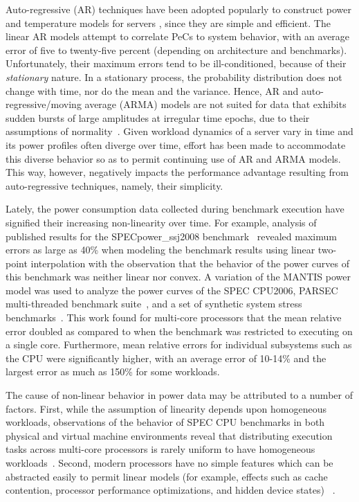 \documentclass[prodmode,acmtaco,pdftex]{acmsmall}
\begin{document}
Auto-regressive (AR) techniques have been adopted popularly to construct
power and temperature models for servers
\cite{Coskun2008,Powell2009,Bircher2011}, since they are simple and
efficient.  The linear AR models attempt to correlate PeCs to system
behavior, with an average error of five to twenty-five percent
(depending on architecture and benchmarks).  Unfortunately, their
maximum errors tend to be ill-conditioned, because of their
\textit{stationary} nature.  In a stationary process, the probability
distribution does not change with time, nor do the mean and the
variance.  Hence, AR and auto-regressive/moving average (ARMA) models
are not suited for data that exhibits sudden bursts of large amplitudes
at irregular time epochs, due to their assumptions of
normality~\cite{Tong1993}.  Given workload dynamics of a server vary in
time and its power profiles often diverge over time, effort has been
made to accommodate this diverse behavior
\cite{MesaMartinez2007,Coskun2008} so as to permit continuing use of AR
and ARMA models.  This way, however, negatively impacts the performance
advantage resulting from auto-regressive techniques, namely, their
simplicity.

Lately, the power consumption data collected during benchmark execution
have signified their increasing non-linearity over time. For example,
analysis of published results for the SPECpower\_ssj2008
benchmark~\cite{Varsampoulos2010,Hsu2011} revealed maximum errors as
large as 40\% when modeling the benchmark results using linear two-point
interpolation with the observation that the behavior of the power curves
of this benchmark was neither linear nor convex.  A variation of the
MANTIS power model \cite{Economou2006} was used to analyze the power
curves of the SPEC CPU2006, PARSEC multi-threaded benchmark
suite~\cite{Bienia2011}, and a set of synthetic system stress
benchmarks~\cite{McCullough2011}.  This work found for multi-core
processors that the mean relative error doubled as compared to when the
benchmark was restricted to executing on a single core.  Furthermore,
mean relative errors for individual subsystems such as the CPU were
significantly higher, with an average error of 10-14\% and the largest
error as much as 150\% for some workloads.

The cause of non-linear behavior in power data may be attributed to a
number of factors.  First, while the assumption of linearity depends
upon homogeneous workloads, observations of the behavior of SPEC CPU
benchmarks in both physical and virtual machine environments reveal that
distributing execution tasks across multi-core processors is rarely
uniform to have homogeneous workloads~\cite{Kansal2010}.  Second, modern
processors have no simple features which can be abstracted
easily to permit linear models (for example, effects such as cache
contention, processor performance optimizations, and hidden device
states) ~\cite{McCullough2011}.
\end{document}
